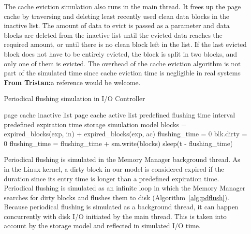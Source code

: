 \documentclass[conference]{IEEEtran}
\newcommand{\Desc}[2]{\State \makebox[2em][l]{#1}#2}
\newcommand{\tristan}[1]{\color{orange}\textbf{From Tristan:}#1\color{black}}
\begin{document}
    The cache eviction simulation also runs in
    the main thread. It frees up the page cache by traversing and deleting
    least recently used clean data blocks in the inactive list.
    The amount of data to evict is passed as a parameter and data blocks are deleted
    from the inactive list until the evicted data reaches the required amount,
    or until there is no clean block left in the list.
    If the last evicted block does not have to be entirely evicted, the block is split in two blocks,
    and only one of them is evicted.
    The overhead of the cache eviction algorithm is not part of the simulated time
    since cache eviction time is negligible in real systems \tristan{a reference would be welcome}.

    \begin{algorithm}\caption{Periodical flushing simulation in I/O Controller}\label{alg:pdflush}
        \small
        \begin{algorithmic}[1]
            \Input
                \Desc{in}{page cache inactive list}
                \Desc{ac}{page cache active list}
                \Desc{t}{predefined flushing time interval}
                \Desc{exp}{predefined expiration time}
                \Desc{sm}{storage simulation model}
               \EndInput
                \State blocks = expired\_blocks(exp, in) + expired\_blocks(exp, ac)
                \State flushing\_time = 0
                  \State blk.dirty = 0 
                  \State flushing\_time = flushing\_time + sm.write(blocks)
                \EndFor
                    \State sleep(t - flushing\_time)
                \EndIf  
            \EndWhile
        \end{algorithmic}
    \end{algorithm}

    Periodical flushing is simulated in the Memory Manager
    background thread. As in the Linux kernel, a dirty block
    in our model is considered expired if
    the duration since its entry time is longer than a
    predefined expiration time.
    Periodical flushing is simulated as an infinite loop in which
    the Memory Manager searches for dirty blocks and flushes them to disk (Algorithm~\ref{alg:pdflush}).
    Because periodical flushing is simulated as a background thread, it can happen concurrently
    with disk I/O initiated by the main thread. This is taken into account by the
    storage model and reflected in simulated I/O time.
\end{document}
